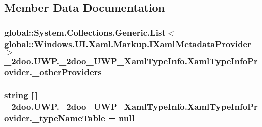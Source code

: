 \subsection{Member Data Documentation}
\hypertarget{class__2doo_1_1_u_w_p_1_1__2doo___u_w_p___xaml_type_info_1_1_xaml_type_info_provider_acb5175a4304dfde2dee06d4e35dd480}{
\subsubsection[{\_\-otherProviders}]{\setlength{\rightskip}{0pt plus 5cm}global::System.Collections.Generic.List$<$global::Windows.UI.Xaml.Markup.IXamlMetadataProvider$>$ {\bf \_\-2doo.UWP.\_\-2doo\_\-UWP\_\-XamlTypeInfo.XamlTypeInfoProvider.\_\-otherProviders}}}
\label{class__2doo_1_1_u_w_p_1_1__2doo___u_w_p___xaml_type_info_1_1_xaml_type_info_provider_acb5175a4304dfde2dee06d4e35dd480}


\hypertarget{class__2doo_1_1_u_w_p_1_1__2doo___u_w_p___xaml_type_info_1_1_xaml_type_info_provider_fb680314b765798a13cb12d18296d496}{
\subsubsection[{\_\-typeNameTable}]{\setlength{\rightskip}{0pt plus 5cm}string \mbox{[}$\,$\mbox{]} {\bf \_\-2doo.UWP.\_\-2doo\_\-UWP\_\-XamlTypeInfo.XamlTypeInfoProvider.\_\-typeNameTable} = null}}
\label{class__2doo_1_1_u_w_p_1_1__2doo___u_w_p___xaml_type_info_1_1_xaml_type_info_provider_fb680314b765798a13cb12d18296d496}


